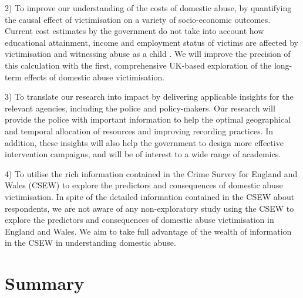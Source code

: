 \documentclass[11pt, a4paper]{article}
\begin{document}
2) To improve our understanding of the costs of domestic abuse, by quantifying the causal effect of victimisation on a variety of socio-economic outcomes. Current cost estimates by the government do not take into account how educational attainment, income and employment status of victims are affected by victimisation and witnessing abuse as a child \cite{costs}. We will improve the precision of this calculation with the first, comprehensive UK-based exploration of the long-term effects of domestic abuse victimisation.

3) To translate our research into impact by delivering applicable insights for the relevant agencies, including the police and policy-makers. Our research will provide the police with important information to help the optimal geographical and temporal allocation of resources and improving recording practices. In addition, these insights will also help the government to design more effective intervention campaigns, and will be of interest to a wide range of academics.

4) To utilise the rich information contained in the Crime Survey for England and Wales (CSEW) to explore the predictors and consequences of domestic abuse victimisation. In spite of the detailed information contained in the CSEW about respondents, we are not aware of any non-exploratory study using the CSEW to explore the predictors and consequences of domestic abuse victimisation in England and Wales. We aim to take full advantage of the wealth of information in the CSEW in understanding domestic abuse.  

   
\section{Summary}


%
%
%
%
%
%
%
%
%
%
%
%
%
\end{document}
